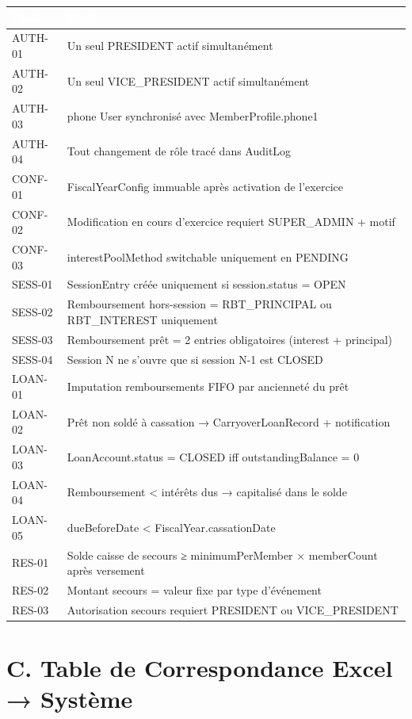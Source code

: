 \documentclass[12pt, a4paper]{report}
\begin{document}
\begin{center}
\small
{}
\begin{tabular}{L{2cm}L{11cm}}
  \toprule
  \textcolor{white}{\textbf{Code}} &
  \textcolor{white}{\textbf{Règle}} \\
  \midrule
  AUTH-01  & Un seul PRESIDENT actif simultanément \\
  AUTH-02  & Un seul VICE\_PRESIDENT actif simultanément \\
  AUTH-03  & phone User synchronisé avec MemberProfile.phone1 \\
  AUTH-04  & Tout changement de rôle tracé dans AuditLog \\
  CONF-01  & FiscalYearConfig immuable après activation de l'exercice \\
  CONF-02  & Modification en cours d'exercice requiert SUPER\_ADMIN + motif \\
  CONF-03  & interestPoolMethod switchable uniquement en PENDING \\
  SESS-01  & SessionEntry créée uniquement si session.status = OPEN \\
  SESS-02  & Remboursement hors-session = RBT\_PRINCIPAL ou RBT\_INTEREST uniquement \\
  SESS-03  & Remboursement prêt = 2 entries obligatoires (interest + principal) \\
  SESS-04  & Session N ne s'ouvre que si session N-1 est CLOSED \\
  LOAN-01  & Imputation remboursements FIFO par ancienneté du prêt \\
  LOAN-02  & Prêt non soldé à cassation → CarryoverLoanRecord + notification \\
  LOAN-03  & LoanAccount.status = CLOSED iff outstandingBalance = 0 \\
  LOAN-04  & Remboursement < intérêts dus → capitalisé dans le solde \\
  LOAN-05  & dueBeforeDate < FiscalYear.cassationDate \\
  RES-01   & Solde caisse de secours ≥ minimumPerMember × memberCount après versement \\
  RES-02   & Montant secours = valeur fixe par type d'événement \\
  RES-03   & Autorisation secours requiert PRESIDENT ou VICE\_PRESIDENT \\
  \bottomrule
\end{tabular}
\end{center}

\section*{C. Table de Correspondance Excel → Système}
\end{document}
